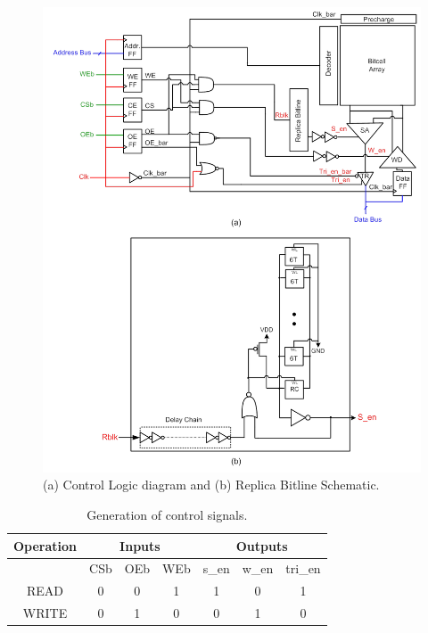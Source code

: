 \begin{figure}[h!]
\centering
\includegraphics[scale=1]{./figs/control_logic.pdf}
\caption{(a) Control Logic diagram and (b) Replica Bitline Schematic.}
\label{fig:control}
\end{figure}



\begin{table}[h!] 
  \begin{center}
    \begin{tabular}{| c | c | c | c | c | c | c |}
    \hline
    Operation & \multicolumn{3}{|c|}{Inputs} & \multicolumn{3}{|c|}{Outputs}\\ \hline
     & CSb & OEb & WEb & s\_en & w\_en & tri\_en\\ \hline
    READ & 0 & 0 & 1 & 1 & 0 & 1\\ \hline
    WRITE & 0 & 1 & 0 & 0 & 1 & 0\\ \hline
    \end{tabular}
  \end{center}
  \caption{Generation of control signals.}
  \label{table:control}
\end{table}
	 
